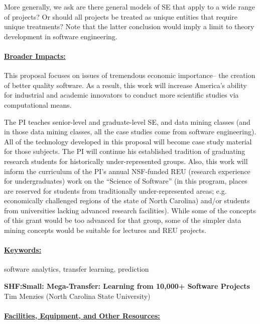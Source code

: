 \documentclass[11pt,letterpaper]{article}
\newcommand\myTitle{\newpage
\begin{center}
{\bf SHF:Small: Mega-Transfer: Learning from 10,000+ Software Projects}\\
Tim Menzies (North Carolina State University)
\end{center}}
\newcommand\head[1]{\paragraph{\underline{#1}}}
\begin{document}
More generally, we ask are there general models of SE that apply to a wide range of projects? Or should all projects be treated as unique entities
that require unique treatments? Note that the latter conclusion would imply a limit to theory development in software engineering.
 

\head{Broader Impacts:}
This proposal focuses on issues of
tremendous economic importance--  the creation of better quality software.
As a result, this work will increase America's ability for industrial and academic innovators to conduct
more scientific studies via computational means.  
 

 The PI teaches senior-level and graduate-level SE, and data mining classes (and in those data mining classes, all the case studies come from software engineering).  All of the technology developed in this proposal will become case study material for those subjects.   The PI will continue his established tradition of graduating  research  students  for  historically  under-represented  groups.   Also, this work will inform the curriculum of the PI's annual
   NSF-funded REU (research experience for undergraduates) work on  the ``Science of Software''
   (in  this program, places are reserved for students from traditionally under-represented areas; e.g.  economically challenged regions of the state of North Carolina) and/or students from universities lacking advanced research facilities). While some of the concepts of this grant would be too advanced for that group, some of the simpler data mining concepts would be suitable for lectures and REU projects.


\head{Keywords:} software analytics, transfer learning,  prediction
\newpage
\pagestyle{plain}

\setcounter{page}{1}
\renewcommand{\thepage} {D--\arabic{page}}
\myTitle



\newpage
\head{Facilities, Equipment, and Other Resources:}


\newpage


\end{document}
